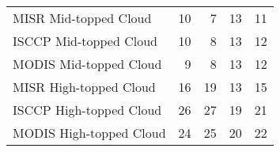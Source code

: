 \begin{tabular}{lrrrr}
   MISR Mid-topped Cloud &                       10 &                        7 &                       13 &                       11 \\
  ISCCP Mid-topped Cloud &                       10 &                        8 &                       13 &                       12 \\
  MODIS Mid-topped Cloud &                        9 &                        8 &                       13 &                       12 \\
  MISR High-topped Cloud &                       16 &                       19 &                       13 &                       15 \\
 ISCCP High-topped Cloud &                       26 &                       27 &                       19 &                       21 \\
 MODIS High-topped Cloud &                       24 &                       25 &                       20 &                       22 \\ \hline
\end{tabular}
